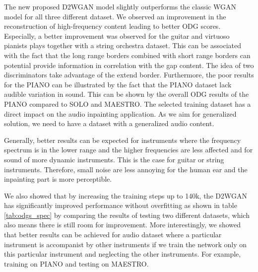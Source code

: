 \documentclass{article} %
\begin{document}
The new proposed D2WGAN model slightly outperforms the classic WGAN model for all three different dataset. We observed an improvement in the reconstruction of high-frequency content leading to better ODG scores. Especially, a better improvement was observed for the guitar and virtuoso pianists plays together with a string orchestra dataset. 
This can be associated with the fact that the long range borders combined with short range borders can potential provide information in correlation with the gap content. The idea of two discriminators take advantage of the extend border. 
Furthermore, the poor results for the PIANO can be illustrated by the fact that the PIANO dataset lack audible variation in sound. This can be shown by the overall ODG results of the PIANO compared to SOLO and MAESTRO. The selected training dataset has a direct impact on the audio inpainting application. As we aim for generalized solution, we need to have a dataset with a generalized audio content. 

Generally, better results can be expected for instruments where the frequency spectrum is in the lower range and the higher frequencies are less affected and for sound of more dynamic instruments. This is the case for guitar or string instruments. Therefore, small noise are less annoying for the human ear and the inpainting part is more perceptible.

We also showed that by increasing the training steps up to 140k, the D2WGAN has significantly improved performance without overfitting as shown in table \ref{tab:odgs_spec} by comparing the results of testing two different datasets, which also means there is still room for improvement. More interestingly, we showed that better results can be achieved for audio dataset where a particular instrument is accompanist by other instruments if we train the network only on this particular instrument and neglecting the other instruments. For example, training on PIANO and testing on MAESTRO.
\end{document}
